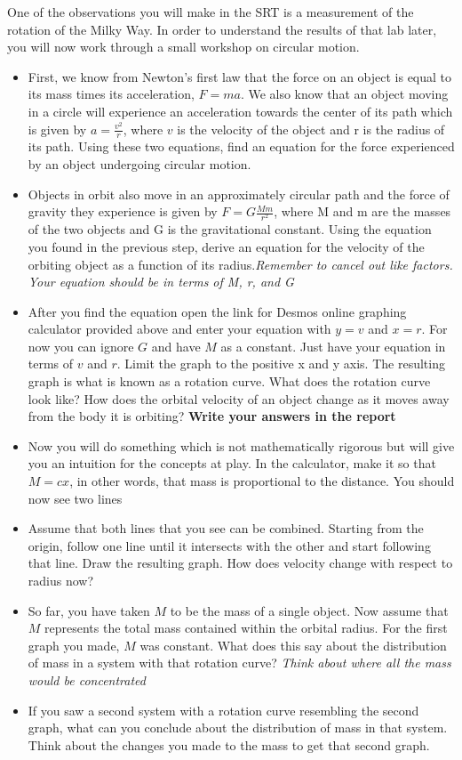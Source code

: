One of the observations you will make in the SRT is a measurement of the rotation of the Milky Way. In order to understand the results of that lab later, you will now work through a small workshop on circular motion.
\begin{itemize}
	\item First, we know from Newton's first law that the force on an object is equal to its mass times its acceleration, $F=ma$. We also know that an object moving in a circle will experience an acceleration towards the center of its path which is given by $a = \frac{v^2}{r}$, where $v$ is the velocity of the object and r is the radius of its path. Using these two equations, find an equation for the force experienced by an object undergoing circular motion. 
	
	\item Objects in orbit also move in an approximately circular path and the force of gravity they experience is given by $F = G\frac{Mm}{r^2}$, where M and m are the masses of the two objects and G is the gravitational constant. Using the equation you found in the previous step, derive an equation for the velocity of the orbiting object as a function of its radius.\textit{Remember to cancel out like factors. Your equation should be in terms of M, r, and G}
	
	\item After you find the equation open the link for Desmos online graphing calculator provided above and enter your equation with $y=v$ and $x=r$. For now you can ignore $G$ and have $M$ as a constant. Just have your equation in terms of $v$ and $r$. Limit the graph to the positive x and y axis. The resulting graph is what is known as a rotation curve. What does the rotation curve look like? How does the orbital velocity of an object change as it moves away from the body it is orbiting? \textbf{Write your answers in the report}
	
	\item Now you will do something which is not mathematically rigorous but will give you an intuition for the concepts at play. In the calculator, make it so that $M=cx$, in other words, that mass is proportional to the distance. You should now see two lines
	
	\item Assume that both lines that you see can be combined. Starting from the origin, follow one line until it intersects with the other and start following that line. Draw the resulting graph. How does velocity change with respect to radius now? 
	
	\item So far, you have taken $M$ to be the mass of a single object. Now assume that $M$ represents the total mass contained within the orbital radius. For the first graph you made, $M$ was constant. What does this say about the distribution of mass in a system with that rotation curve? \textit{Think about where all the mass would be concentrated}
	
	\item If you saw a second system with a rotation curve resembling the second graph, what can you conclude about the distribution of mass in that system. Think about the changes you made to the mass to get that second graph. 
\end{itemize}
